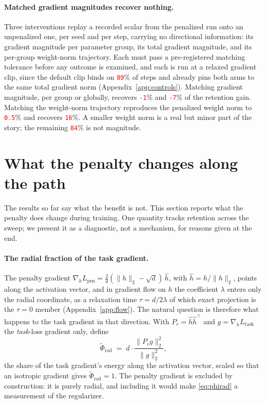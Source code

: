 \documentclass[anon]{opt2026}     %
\newcommand{\PH}[1]{\textcolor{red}{\texttt{#1}}}   %
\newcommand{\phirad}{\tilde{\Phi}_{\mathrm{rad}}}
\begin{document}
\paragraph{Matched gradient magnitudes recover nothing.} Three interventions
replay a recorded scalar from the penalized run onto an unpenalized one, per
seed and per step, carrying no directional information: its gradient magnitude
per parameter group, its total gradient magnitude, and its per-group weight-norm
trajectory. Each must pass a pre-registered matching tolerance before any
outcome is examined, and each is run at a relaxed gradient clip, since the
default clip binds on \PH{89}\% of steps and already pins both arms to the same
total gradient norm (Appendix~\ref{app:controls}). Matching gradient magnitude,
per group or globally, recovers \PH{-1}\% and \PH{-7}\% of the retention gain.
Matching the weight-norm trajectory reproduces the penalized weight norm to
\PH{0.5}\% and recovers \PH{16}\%. A smaller weight norm is a real but minor
part of the story; the remaining \PH{84}\% is not magnitude.

\section{What the penalty changes along the path}
\label{sec:path}

The results so far say what the benefit is not. This section reports what the
penalty does change during training. One quantity tracks retention across the
sweep; we present it as a diagnostic, not a mechanism, for reasons given at the
end.

\paragraph{The radial fraction of the task gradient.} The penalty gradient
$\nabla_h L_{\mathrm{pen}} = \tfrac{2}{d}(\|h\|_2 - \sqrt d)\,\hat h$, with
$\hat h = h/\|h\|_2$, points along the activation vector, and in gradient flow
on $h$ the coefficient $\lambda$ enters only the radial coordinate, as a
relaxation time $\tau = d/2\lambda$ of which exact projection is the $\tau = 0$
member (Appendix~\ref{app:flow}). The natural question is therefore what
happens to the task gradient in that direction. With
$P_r = \hat h \hat h^{\top}$ and $g = \nabla_h L_{\mathrm{task}}$ the
\emph{task}-loss gradient only, define
\begin{equation}
\label{eq:phirad}
\phirad \;=\; d \cdot \frac{\|P_r g\|_2^{2}}{\|g\|_2^{2}},
\end{equation}
the share of the task gradient's energy along the activation vector, scaled so
that an isotropic gradient gives $\phirad = 1$. The penalty gradient is excluded
by construction: it is purely radial, and including it would make
\eqref{eq:phirad} a measurement of the regularizer.
\end{document}
